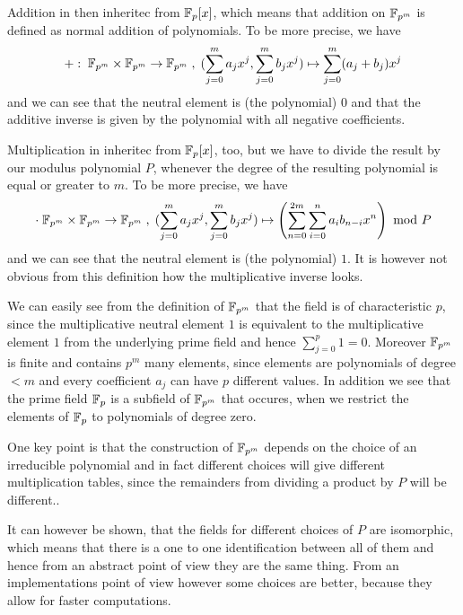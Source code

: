 Addition in then inheritec from $\mathbb{F}_p[x]$, which means that addition on $\mathbb{F}_{p^m}$ is defined as normal addition of polynomials. To be more precise, we have
\begin{equation}
+:\; \mathbb{F}_{p^m}\times \mathbb{F}_{p^m} \to \mathbb{F}_{p^m}\; ,\; (\sum_{j=0}^m a_j x^j,\sum_{j=0}^m b_j x^j)\mapsto \sum_{j=0}^m (a_j+b_j) x^j 
\end{equation}
and we can see that the neutral element is (the polynomial) $0$ and that the additive inverse is given by the polynomial with all negative coefficients.

Multiplication in inheritec from $\mathbb{F}_p[x]$, too, but we have to divide the result by our modulus polynomial $P$, whenever the degree of the resulting polynomial is equal or greater to $m$. To be more precise, we have
\begin{equation}
\cdot\; \mathbb{F}_{p^m}\times \mathbb{F}_{p^m} \to \mathbb{F}_{p^m}\; ,\; (\sum_{j=0}^m a_j x^j,\sum_{j=0}^m b_j x^j)\mapsto \left(\sum _{n = 0} ^{2m} \sum _{i = 0} ^{n}{a} _{i }{{b} _{n-i}}{x} ^{n}\right) \text{ mod } P 
\end{equation}
and we can see that the neutral element is (the polynomial) $1$. It is however not obvious from this definition how the multiplicative inverse looks.

We can easily see from the definition of $\mathbb{F}_{p^m}$ that the field is of characteristic $p$, since the multiplicative neutral element $1$ is equivalent to the multiplicative element $1$ from the underlying prime field and hence $\sum_{j=0}^p 1=0$. Moreover $\mathbb{F}_{p^m}$ is finite and contains $p^m$ many elements, since elements are polynomials of degree $<m$ and every coefficient $a_j$ can have $p$ different values. In addition we see that the prime field $\mathbb{F}_p$ is a subfield of $\mathbb{F}_{p^m}$ that occures, when we restrict the elements of $\mathbb{F}_{p}$ to polynomials of degree zero.

One key point is that the construction of $\mathbb{F}_{p^m}$ depends on the choice of an irreducible polynomial and in fact different choices will give different multiplication tables, since the remainders from dividing a product by $P$ will be different..

It can however be shown, that the fields for different choices of $P$ are isomorphic, which means that there is a one to one identification between all of them and hence from an abstract point of view they are the same thing. From an implementations point of view however some choices are better, because they allow for faster computations.

